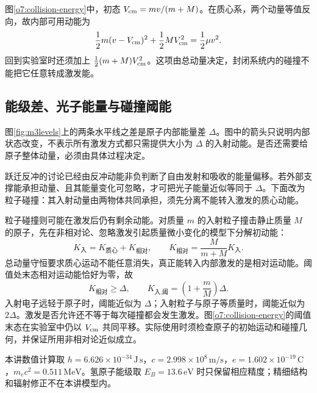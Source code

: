 图\ref{o7:collision-energy}中，初态 $V_{\rm cm}=mv/(m+M)$。在质心系，两个动量等值反向，故内部可用动能为
\[
 \frac12m(v-V_{\rm cm})^2+\frac12MV_{\rm cm}^2
 =\frac12\mu v^2.
\]
回到实验室时还须加上 $\tfrac12(m+M)V_{\rm cm}^2$。这项由总动量决定，封闭系统内的碰撞不能把它任意转成激发能。

\subsection{能级差、光子能量与碰撞阈能}

图\ref{fig:m3levels}上的两条水平线之差是原子内部能量差 $\Delta$。图中的箭头只说明内部状态改变，不表示所有激发方式都只需提供大小为 $\Delta$ 的入射动能。是否还需要给原子整体动量，必须由具体过程决定。

跃迁反冲的讨论已经由反冲动能非负判断了自由发射和吸收的能量偏移。若外部支撑能承担动量、且其能量变化可忽略，才可把光子能量近似等同于 $\Delta$。下面改为粒子碰撞：其入射动量由两物体共同承担，须先分离不能转入激发的质心动能。

粒子碰撞则可能在激发后仍有剩余动能。对质量 $m$ 的入射粒子撞击静止质量 $M$ 的原子，先在非相对论、忽略激发引起质量微小变化的模型下分解初动能：
\[
 K_{\text{入}}=K_{\text{质心}}+K_{\text{相对}},\qquad
 K_{\text{相对}}=\frac{M}{m+M}K_{\text{入}}.
\]
总动量守恒要求质心运动不能任意消失，真正能转入内部激发的是相对运动能。阈值处末态相对运动能恰好为零，故
\[
 K_{\text{相对}}\ge\Delta,\qquad
 \boxed{K_{\text{入,阈}}=\left(1+\frac mM\right)\Delta}.
\]
入射电子远轻于原子时，阈能近似为 $\Delta$；入射粒子与原子等质量时，阈能近似为 $2\Delta$。激发是否允许还不等于每次碰撞都会发生激发。图\ref{o7:collision-energy}的阈值末态在实验室中仍以 $V_{\rm cm}$ 共同平移。实际使用时须检查原子的初始运动和碰撞几何，并保证所用非相对论近似成立。

本讲数值计算取 \(h=6.626\times10^{-34}\,\mathrm{J\,s}\)，\(c=2.998\times10^8\,\mathrm{m/s}\)，\(e=1.602\times10^{-19}\,\mathrm C\)，\(m_ec^2=0.511\,\mathrm{MeV}\)。氢原子能级取 \(E_B=13.6\,\mathrm{eV}\) 时只保留相应精度；精细结构和辐射修正不在本讲模型内。
